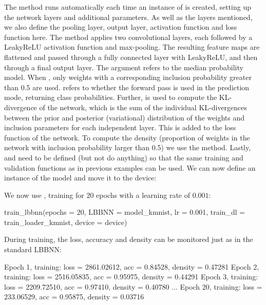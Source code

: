 The  method runs automatically each time an instance of  is created, setting up the network layers and additional parameters. As well as the layers mentioned, we also define the pooling layer, output layer, activation function and loss function here. The method  applies two convolutional layers, each followed by a LeakyReLU activation function and max-pooling. The resulting feature maps are flattened and passed through a fully connected layer with LeakyReLU, and then through a final output layer. The argument  refers to the median probability model. When , only weights with a corresponding inclusion probability greater than 0.5 are used.  refers to whether the forward pass is used in the prediction mode, returning class probabilities. Further,  is used to compute the KL-divergence of the network, which is the sum of the individual KL-divergences between the prior and posterior (variational) distribution of the weights and inclusion parameters for each independent layer. This is added to the loss function of the network. To compute the density (proportion of weights in the network with inclusion probability larger than 0.5) we use the  method. Lastly,  and  need to be defined (but not do anything) so that the same training and validation functions as in previous examples can be used. We can now define an instance of the model and move it to the device:
We now use , training for $20$ epochs with a learning rate of $0.001$:
\begin{example}
train_lbbnn(epochs = 20, LBBNN = model_kmnist, lr = 0.001, train_dl = train_loader_kmnist,
            device = device)
\end{example}
During training, the loss, accuracy and density can be monitored just as in the standard LBBNN:
\begin{example}
Epoch 1, training: loss = 2861.02612, acc = 0.84528, density = 0.47281
Epoch 2, training: loss = 2516.05835, acc = 0.95975, density = 0.44291
Epoch 3, training: loss = 2209.72510, acc = 0.97410, density = 0.40780
...
Epoch 20, training: loss = 233.06529, acc = 0.95875, density = 0.03716
\end{example}
